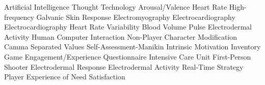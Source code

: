    {Artificial Intelligence}
   {Thought Technology}
   {Arousal/Valence}
   {Heart Rate}
   {High-frequency}
  {Galvanic Skin Response}
  {Electromyography}
  {Electrocardiography}
  {Electrocardiography}
  {Heart Rate Variability}
  {Blood Volume Pulse}
  {Electrodermal Activity}
  {Human Computer Interaction}
  {Non-Player Character}
  {Modification}
  {Camma Separated Values}
  {Self-Assessment-Manikin}
  {Intrinsic Motivation Inventory}
  {Game Engagement/Experience Questionnaire}
  {Intensive Care Unit}
  {First-Person Shooter}
  {Electrodermal Response}
  {Electrodermal Activity}
  {Real-Time Strategy}
 {Player Experience of Need Satisfaction}
